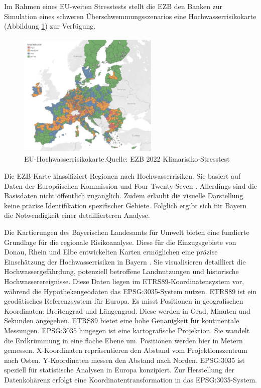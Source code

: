 Im Rahmen eines EU-weiten Stresstests stellt die \ac{EZB} den Banken zur Simulation eines schweren Überschwemmungsszenarios eine Hochwasserrisikokarte (Abbildung \ref{fig:euflut}) zur Verfügung.

\begin{figure}[htbp]
    \centering
    \includegraphics[width=0.6\textwidth]{figures/euflood.png} 
    \caption{EU-Hochwasserrisikokarte.Quelle: EZB 2022 Klimarisiko-Stresstest}
    \label{fig:euflut}
\end{figure}
\FloatBarrier

Die \ac{EZB}-Karte klassifiziert Regionen nach Hochwasserrisiken. Sie basiert auf Daten der Europäischen Kommission und Four Twenty Seven \parencite{ECB2022ClimateStressTest}. Allerdings sind die Basisdaten nicht öffentlich zugänglich. Zudem erlaubt die visuelle Darstellung keine präzise Identifikation spezifischer Gebiete. Folglich ergibt sich für Bayern die Notwendigkeit einer detaillierteren Analyse.

Die Kartierungen des Bayerischen Landesamts für Umwelt bieten eine fundierte Grundlage für die regionale Risikoanalyse. Diese für die Einzugsgebiete von Donau, Rhein und Elbe entwickelten Karten ermöglichen eine präzise Einschätzung der Hochwasserrisiken in Bayern \parencite{LfU_Bayern}. Sie visualisieren detailliert die Hochwassergefährdung, potenziell betroffene Landnutzungen und historische Hochwasserereignisse.
Diese Daten liegen im ETRS89-Koordinatensystem vor, während die Hypothekengeodaten das EPSG:3035-System nutzen. ETRS89 ist ein geodätisches Referenzsystem für Europa. Es misst Positionen in geografischen Koordinaten: Breitengrad und Längengrad. Diese werden in Grad, Minuten und Sekunden angegeben. ETRS89 bietet eine hohe Genauigkeit für kontinentale Messungen.
EPSG:3035 hingegen ist eine kartografische Projektion. Sie wandelt die Erdkrümmung in eine flache Ebene um. Positionen werden hier in Metern gemessen. X-Koordinaten repräsentieren den Abstand vom Projektionszentrum nach Osten. Y-Koordinaten messen den Abstand nach Norden. EPSG:3035 ist speziell für statistische Analysen in Europa konzipiert.
Zur Herstellung der Datenkohärenz erfolgt eine Koordinatentransformation in das EPSG:3035-System. 

